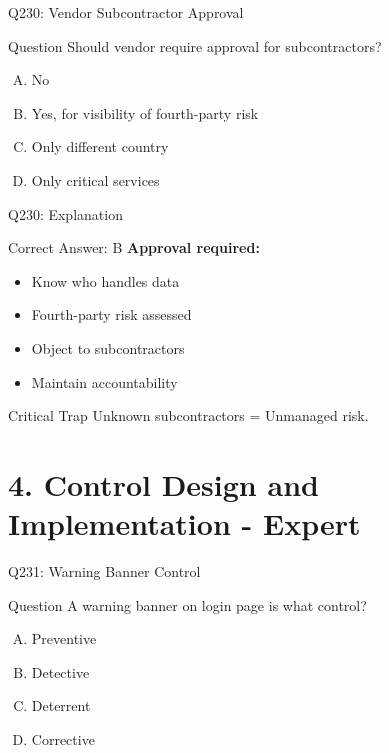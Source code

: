 \documentclass{beamer}
\begin{document}
	\begin{frame}{Q230: Vendor Subcontractor Approval}
		\begin{block}{Question}
			Should vendor require approval for subcontractors?
		\end{block}
		\begin{enumerate}[(A)]
			\item No
			\item Yes, for visibility of fourth-party risk
			\item Only different country
			\item Only critical services
		\end{enumerate}
	\end{frame}
	
	\begin{frame}{Q230: Explanation}
		\begin{block}{Correct Answer: B}
			\textbf{Approval required:}
			\begin{itemize}
				\item Know who handles data
				\item Fourth-party risk assessed
				\item Object to subcontractors
				\item Maintain accountability
			\end{itemize}
		\end{block}
		\begin{alertblock}{Critical Trap}
			Unknown subcontractors = Unmanaged risk.
		\end{alertblock}
	\end{frame}
	
	
	\section{4. Control Design and Implementation - Expert}
	
	\begin{frame}{Q231: Warning Banner Control}
		\begin{block}{Question}
			A warning banner on login page is what control?
		\end{block}
		\begin{enumerate}[(A)]
			\item Preventive
			\item Detective
			\item Deterrent
			\item Corrective
		\end{enumerate}
	\end{frame}
	
\end{document}
